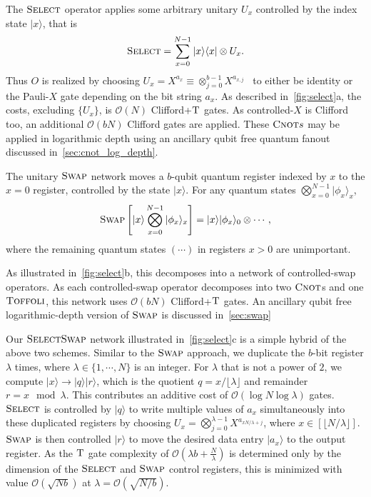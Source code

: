 \documentclass[a4paper,onecolumn,10pt,accepted=2024-05-22]{quantumarticle}
\newcommand{\ket}[1]{| #1\rangle}        %
\newcommand{\bra}[1]{\langle #1|}        %
\begin{document}
	The $\textsc{Select}$ operator applies some arbitrary unitary $U_x$ controlled by the index state $\ket{x}$, that is
	\begin{align}
	\textsc{Select}=\sum_{x=0}^{N-1}\ket{x}\bra{x}\otimes U_x.
	\end{align}
	Thus $O$ is realized by choosing $U_x=X^{a_x}\equiv\otimes^{b-1}_{j=0}X^{a_{x,j}}$~\cite{Babbush2018encoding} to either be identity or the Pauli-$X$ gate depending on the bit string $a_x$. As described in~\cref{fig:select}a, the costs, excluding $\{U_x\}$, is $\mathcal{O}(N)$ Clifford+$\textsc{T}$ gates. As controlled-$X$ is Clifford too, an additional $\mathcal{O}(bN)$ Clifford gates are applied. These $\textsc{Cnot}s$ may be applied in logarithmic depth using an ancillary qubit free quantum fanout discussed in~\cref{sec:cnot_log_depth}.
	
	The unitary $\textsc{Swap}$ network moves a $b$-qubit quantum register indexed by $x$ to the $x=0$ register, controlled by the state $\ket{x}$. For any quantum states $\bigotimes_{x=0}^{N-1}\ket{\phi_x}_x$,
	\begin{align}
	\textsc{Swap}\left[\ket{x}\bigotimes_{x=0}^{N-1}\ket{\phi_x}_x\right]=\ket{x}\ket{\phi_x}_0\otimes \cdots,
	\end{align}
	where the remaining quantum states $(\cdots)$ in registers $x>0$ are unimportant. 
	
	As illustrated in~\cref{fig:select}b, this decomposes into a network of controlled-swap operators. As each controlled-swap operator decomposes into two $\textsc{Cnot}$s and one $\textsc{Toffoli}$, this network uses $\mathcal{O}(bN)$ Clifford+$\textsc{T}$ gates. An ancillary qubit free logarithmic-depth version of $\textsc{Swap}$ is discussed in~\cref{sec:swap}
	
	Our $\textsc{SelectSwap}$ network illustrated in~\cref{fig:select}c is a simple hybrid of the above two schemes. Similar to the $\textsc{Swap}$ approach, we duplicate the $b$-bit register $\lambda$ times, where $\lambda\in\{1,\cdots,N\}$ is an integer. For $\lambda$ that is not a power of $2$, we compute $\ket{x}\rightarrow\ket{q}\ket{r}$, which is the quotient $q=x/\lfloor\lambda\rfloor$ and remainder $r=x\mod{\lambda}$. This contributes an additive cost of $\mathcal{O}(\log{N}\log{\lambda})$ gates. $\textsc{Select}$ is controlled by $\ket{q}$ to write multiple values of $a_x$ simultaneously into these duplicated registers by choosing $U_x=\bigotimes^{\lambda-1}_{j=0} X^{a_{x N/\lambda+j}}$, where $x\in[\lfloor N/\lambda\rfloor]$. $\textsc{Swap}$ is then controlled $\ket{r}$ to move the desired data entry $\ket{a_x}$ to the output register. As the $\textsc{T}$ gate complexity of $\mathcal{O}(\lambda b+\frac{N}{\lambda})$ is determined only by the dimension of the $\textsc{Select}$ and $\textsc{Swap}$ control registers, this is minimized with value $\mathcal{O}(\sqrt{Nb})$ at $\lambda=\mathcal{O}(\sqrt{N/b})$.
	
\end{document}
